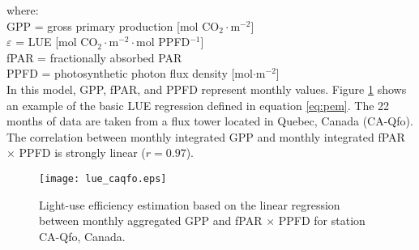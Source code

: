 \noindent where:\\
\indent GPP = gross primary production [mol CO$_{2}\cdot$m$^{-2}$]\\
\indent $\varepsilon$ = LUE [mol CO$_{2}\cdot$m$^{-2}\cdot$mol PPFD$^{-1}$]\\
\indent fPAR = fractionally absorbed PAR\\
\indent PPFD = photosynthetic photon flux density [mol$\cdot$m$^{-2}$]\\

\noindent In this model, GPP, fPAR, and PPFD represent monthly values.  
Figure \ref{fig:lue} shows an example of the basic LUE regression defined in equation \ref{eq:pem}.  
The 22 months of data are taken from a flux tower located in Quebec, Canada (CA-Qfo).  
The correlation between monthly integrated GPP and monthly integrated fPAR $\times$ PPFD is strongly linear ($r = 0.97$).
\begin{figure}[h!]
	\centering
    \texttt{[image: lue\_caqfo.eps]}
    \caption{Light-use efficiency estimation based on the linear regression 
    between monthly aggregated GPP and fPAR $\times$ PPFD for station CA-Qfo, 
    Canada.}
    \label{fig:lue}
\end{figure}

